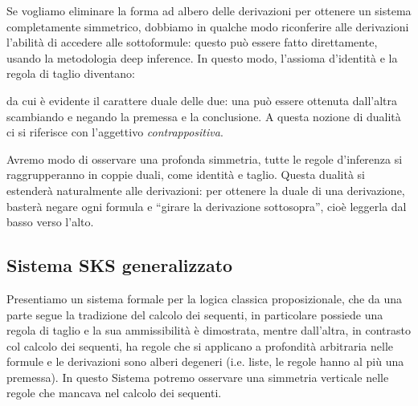 \documentclass[12pt,a4paper,openright,twoside]{report}
\begin{document}
Se vogliamo eliminare la forma ad albero delle derivazioni per ottenere un sistema completamente simmetrico, dobbiamo in qualche modo riconferire alle derivazioni l'abilit\`a di accedere alle sottoformule: questo pu\`o essere fatto direttamente, usando la metodologia deep inference. In questo modo, l'assioma d'identit\`a e la regola di taglio diventano:

da cui \`e evidente il carattere duale delle due: una pu\`o essere ottenuta dall'altra scambiando e negando la premessa e la conclusione. A questa nozione di dualit\`a ci si riferisce con l'aggettivo \emph{contrappositiva}.

Avremo modo di osservare una profonda simmetria, tutte le regole d'inferenza si raggrupperanno in coppie duali, come identit\`a e taglio. Questa dualit\`a si estender\`a naturalmente alle derivazioni: per ottenere la duale di una derivazione, baster\`a negare ogni formula e ``girare la derivazione sottosopra'', cio\`e leggerla dal basso verso l'alto.


\subsection{Sistema SKS generalizzato} 
Presentiamo un sistema formale per la logica classica proposizionale, che da una parte segue la tradizione del calcolo dei sequenti, in particolare possiede una regola di taglio e la sua ammissibilit\`a \`e dimostrata, mentre dall'altra, in contrasto col calcolo dei sequenti, ha regole che si applicano a profondit\`a arbitraria nelle formule e le derivazioni sono alberi degeneri (i.e. liste, le regole hanno al pi\`u una premessa). In questo Sistema potremo osservare una simmetria verticale nelle regole che mancava nel calcolo dei sequenti.
\end{document}
